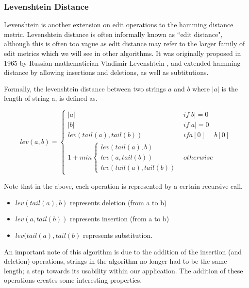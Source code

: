 \documentclass[a4paper,11pt]{article}
\begin{document}
\subsubsection{Levenshtein Distance}
Levenshtein is another extension on edit operations to the hamming distance metric. Levenshtein distance is often informally known as ``edit distance", although this is often too vague as edit distance may refer to the larger family of edit metrics which we will see in other algorithms. It was originally proposed in 1965 by Russian mathematician Vladimir Levenshtein \citep{levenshtein1965binary}, and extended hamming distance by allowing insertions and deletions, as well as subtitutions.

Formally, the levenshtein distance between two strings $a$ and $b$ where $|a|$ is the length of string a, is defined as.

\begin{equation}
    lev(a,b)= \left\{\begin{matrix}
 |a| & if |b|=0\\ 
 |b| & if |a|=0\\ 
 lev(tail(a), tail(b))& if a[0]=b[0] \\ 
 1 + min\left\{\begin{matrix}
lev(tail(a),b)\\ 
lev(a,tail(b))\\
lev(tail(a),tail(b)) 

\end{matrix}\right.& otherwise 
\end{matrix}\right.
\end{equation}

Note that in the above, each operation is represented by a certain recursive call.
\begin{itemize}
    \item $lev(tail(a), b)$ represents deletion (from a to b)
    \item $lev(a, tail(b))$ represents insertion (from a to b)
    \item $lev(tail(a), tail(b)$ represents substitution.
\end{itemize}

An important note of this algorithm is due to the addition of the insertion (and deletion) operations, strings in the algorithm no longer had to be the same length; a step towards its usability within our application. The addition of these operations creates some interesting properties.
\end{document}
